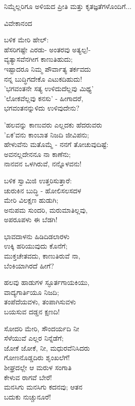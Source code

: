 ನಿಮ್ಮೆಲ್ಲರಿಗೂ ಅಳಿಯದ ಪ್ರೀತಿ ಮತ್ತು ಕೃತಜ್ಞತೆಗಳೊಂದಿಗೆ...

\begin{flushright}
ವಿವೇಕಾನಂದ
\end{flushright}

\begin{myquote}
ಬಳಿಕ ಮೇರಿ ಹೇಲ್:\\ಹೆಸರಿಗಷ್ಟೇ ಎರಡು- ಅಂತರವು ಅತ್ಯಲ್ಪ!-\\ವ್ಯತ್ಯಾಸವೆನಗೀಗ ಕಾಣುತಿಹುದು;\\ಇಷ್ಟಾದರೂ ನಿಮ್ಮ ಪೌರ್ವಾತ್ಯ ತರ್ಕವದು\\ನನ್ನ ಬುದ್ಧಿಗದೇಕೊ ಎಟುಕದಿಹುದು!\\'ಭಗವಂತನೇ ಸತ್ಯ ಉಳಿದುದೆಲ್ಲವು ಮಿಥ್ಯ'\\'ಲೋಕವೆಲ್ಲವು ಕನಸು' - ಹೀಗಾದರೆ,\\ಭಗವಂತನನ್ನುಳಿದು ಉಳಿವುದೇನು?
\end{myquote}

\begin{myquote}
'ಹಲವನ್ನು ಕಾಣುವರು ಎಲ್ಲದಕು ಹೆದರುವರು\\'ಏಕ'ವನು ಕಾಂಬಾತ ನಿಜದಿ ಜೀವಿಪನು;\\ಹೇಳುವೆನು ಮತೊಮ್ಮೆ - ನನಗೆ ತೋಚುವುದಿಷ್ಟೆ:\\ಅವನಲ್ಲದೇನನೂ ನಾ ಕಾಣೆನು;\\ನಾನವನ ಒಳಗಿರುವೆ, ನನ್ನೊಳವನು!
\end{myquote}

\begin{myquote}
ಬಳಿಕ ಸ್ವಾಮಿಜಿ ಉತ್ತರಿಸುತ್ತಾರೆ:\\ಚುರುಕಿನ ಬುದ್ಧಿ - ಹೋಲಿಸಲಸದಳ\\ಮೇರಿ ವಿಲಕ್ಷಣ ಹುಡುಗಿ;\\ಅನುಪಮ ಸುಂದರಿ, ಮರುಮಾತಿಲ್ಲವು,\\ಅಪರೂಪಳು ಈ ಬೆಡಗಿ!
\end{myquote}

\begin{myquote}
ಭಾವದಾಳನು ಹಿಡಿದಿಡಲಾರಳು\\ಉಕ್ಕಿ ಹರಿಯುವುದು ಕೊನೆಗೆ;\\ಮುಕ್ತಚೇತವದು, ಕಾಣುತಿರುವೆ ನಾ,\\ಬೆಂಕಿಯಾಗಿರದೆ ಹೀಗೆ?
\end{myquote}

\begin{myquote}
ಹಲವು ಹಾಡುಗಳ ಸ್ಫೂರ್ತಗಾಯಕಿಯು,\\ವಾದ್ಯಗಾರ್ತಿಯೂ ನಿಜದಿ;\\ತಂಪೆದೆಯವಳು, ತಂಪಾಗಿಸುವಳು\\ಬಯಸುವ ದಡ್ಡನ ಕ್ಷಣದಿ!
\end{myquote}

\begin{myquote}
ಸೋದರಿ ಮೇರಿ, ಸೌಂದರ್ಯದಿ ನೀ\\ಸೆಳೆಯುವೆ ಎಲ್ಲರ ನಿನ್ನೆಡೆಗೆ;\\ಜೋಕೆ ಜೋಕೆ, ನೀ, ಮಧುರವೆನಿಸಿದರು\\ಗೋಣನೊಡ್ಡದಿರು ಶೃಂಖಲೆಗೆ!\\ಶೀಘ್ರದಲ್ಲೇ ಆ ಮರುಳ ಸಂಗಾತಿ\\ಕೇಳುವ ರಾಗವೆ ಬೇರೆ!\\ಮನಸಿಗು ಮನಸಿಗು ಕದನವು; ಆತನ\\ಬದುಕು ನುಚ್ಚುನೂರೆ!
\end{myquote}

